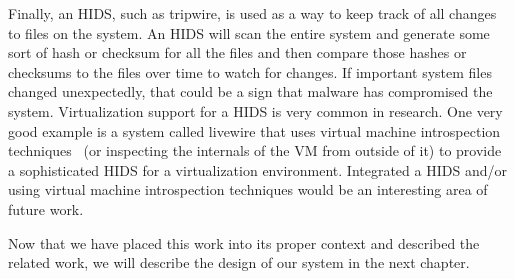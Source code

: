 Finally, an HIDS, such as tripwire\cite{kim_tripwire_1994}, is used as a way to keep track of all changes to files on the system. An HIDS will scan the entire system and generate some sort of hash or checksum for all the files and then compare those hashes or checksums to the files over time to watch for changes. If important system files changed unexpectedly, that could be a sign that malware has compromised the system. Virtualization support for a HIDS is very common in research. One very good example is a system called livewire\cite{VMI_IDS_2003} that uses virtual machine introspection techniques~\cite{xenaccess_07,vmsafe_news_2008} (or inspecting the internals of the VM from outside of it) to provide a sophisticated HIDS for a virtualization environment. Integrated a HIDS and/or using virtual machine introspection techniques would be an interesting area of future work.

Now that we have placed this work into its proper context and described the related work, we will describe the design of our system in the next chapter.



